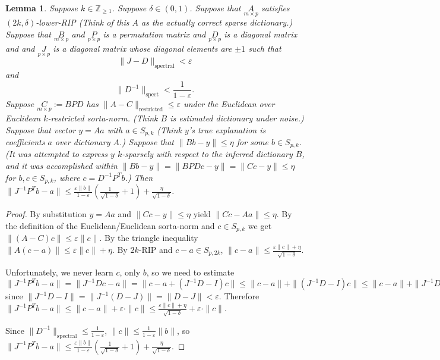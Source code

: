 \documentclass[11pt]{amsart}
\newtheorem{lemma}{Lemma}
\begin{document}
\begin{lemma}
Suppose $k\in \mathbb{Z}_{\geq 1}$.  Suppose $\delta \in (0,1)$.  
Suppose that $\underset{m\times p}{A}$ satisfies $(2k,\delta)$-lower-RIP
(Think of this $A$ as the actually correct sparse dictionary.)
Suppose that $\underset{m\times p}{B}$ and $\underset{p\times p}{P}$ is a permutation matrix and $\underset{p\times p}{D}$
is a diagonal matrix and and $\underset{p\times p}{J}$
is a diagonal matrix whose diagonal elements are $\pm 1$ such that 
 \begin{equation}
 \|J-D\|_\text{spectral}<\varepsilon
 \end{equation}
 and 
\begin{equation}\|D^{-1}\|_\text{spect}<\frac{1}{1-\varepsilon}.
\end{equation}
Suppose  $\underset{m\times p}{C}:=BPD$ has  $\|A-C\|_\text{restricted} \leq \varepsilon$ under the Euclidean over Euclidean $k$-restricted
sorta-norm.   (Think $B$ is estimated dictionary under noise.)   
Suppose that vector $y=Aa$ with $a\in S_{p,k}$ (Think $y$'s true explanation is coefficients $a$ over dictionary $A$.) 
Suppose that $\|Bb-y\|\leq \eta$ for some $b\in S_{p,k}$.  (It was attempted to express $y$ $k$-sparsely with respect to 
the inferred dictionary $B$, and it was accomplished within $\|Bb-y\|=\|BPDc-y\|=\|Cc-y\|\leq \eta$ for $b,c\in S_{p,k}$, where 
$c=D^{-1}P^Tb$.)
Then $\|J^{-1}P^Tb-a\| \leq \frac{\varepsilon \|b\|}{1-\varepsilon}(\frac{1}{\sqrt{1-\delta}}+1)+\frac{\eta}{\sqrt{1-\delta}}$.
\end{lemma}
\begin{proof}
By substitution $y=Aa$ and $\|Cc-y\|\leq \eta$ yield $\|Cc-Aa\|\leq \eta$.
By the definition of the Euclidean/Euclidean sorta-norm and  $c\in S_{p,k}$ we get
$\|(A-C)c\|\leq \varepsilon \|c\|$.  By the triangle inequality $\|A(c-a)\|\leq \varepsilon \|c\| + \eta$.  By $2k$-RIP and $c-a \in S_{p,2k}$, 
$\|c-a\|\leq \frac{\varepsilon \|c\| + \eta}{\sqrt{1-\delta}}$.

Unfortunately, we never learn $c$, only $b$, so we need to estimate
$\|J^{-1}P^Tb-a\|=\|J^{-1}Dc-a\|=\|c-a+(J^{-1}D-I)c\|\leq \|c-a\|+\|(J^{-1}D-I)c\|\leq \|c-a\|+\|J^{-1}D-I\|\cdot \|c\|\leq \|c-a\|+\varepsilon \cdot \|c\|$ since $\|J^{-1}D-I\|=\|J^{-1}(D-J)\|=\|D-J\|<\varepsilon$.
Therefore $\|J^{-1}P^Tb-a\|\leq \|c-a\|+\varepsilon \cdot \|c\|\leq \frac{\varepsilon \|c\| + \eta}{\sqrt{1-\delta}}+\varepsilon \cdot \|c\|$.

Since $\|D^{-1}\|_\text{spectral}\leq \frac{1}{1-\varepsilon}$, $\|c\|\leq \frac{1}{1-\varepsilon}\|b\|$, so 
$\|J^{-1}P^Tb-a\| \leq \frac{\varepsilon \|b\|}{1-\varepsilon}(\frac{1}{\sqrt{1-\delta}}+1)+\frac{\eta}{\sqrt{1-\delta}}$.
\end{proof}
\end{document}
